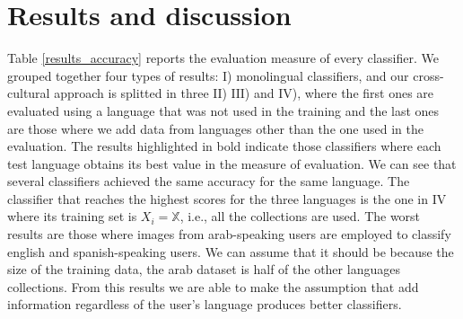 \documentclass[runningheads]{llncs}
\begin{document}
\section{Results and discussion}\label{section:results}

Table \ref{results_accuracy} reports the evaluation measure 
of every classifier. We grouped together
four types of results: $\mathrm{I}$) monolingual classifiers,
and our cross-cultural approach is splitted in three $\mathrm{II}$) 
$\mathrm{III}$) and $\mathrm{IV}$), where the first ones are evaluated using 
a language that was not used in the training and the last ones are 
those where we add data from languages other than the one used in 
the evaluation. The results highlighted in bold indicate those 
classifiers where each test language obtains its best value in the 
measure of evaluation. We can see that several classifiers achieved 
the same accuracy for the same language. The classifier that reaches
the highest scores for the three languages is the one in $\mathrm{IV}$ where its 
training set is $X_i = \mathbb{X}$, i.e., all the collections are used.
The worst results are those where images from arab-speaking users
are employed to classify english and spanish-speaking users. We 
can assume that it should be because the size of the training data,
the arab dataset is half of the other languages collections.
From this results we are able to make the assumption that
add information regardless of the user's language produces better
classifiers.
\end{document}
